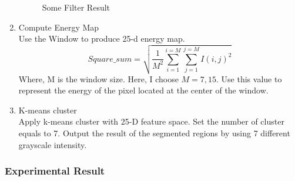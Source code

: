 \documentclass[11pt]{article}
\begin{document}
\begin{enumerate}
\begin{figure}[!htbp]
{	}
	 \qquad
	 
	\caption{Some Filter Result} 
	\label{lawsfiltered}  
\end{figure}

	
	
\item Compute Energy Map\\
Use the Window to produce 25-d energy map.
\begin{equation}
Square\_ sum=\sqrt { \frac { 1 }{ M^2 } \sum _{ i=1 }^{ i=M }{ \sum _{ j=1 }^{ j=M }{ { I(i,j) }^{ 2 } }  }  } 
\end{equation}
Where, M is the window size. Here, I choose $M = 7,15$. Use this value to represent the energy of the pixel located at the center of the window.
\item K-means cluster \\
Apply k-means cluster with 25-D feature space. Set the number of cluster equals to 7. Output the result of the segmented regions by using 7 different grayscale intensity.
\end{enumerate} 
\subsubsection{Experimental Result}
\end{document}
